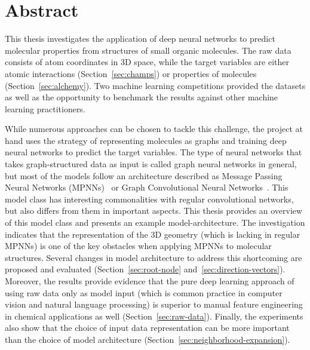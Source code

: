%


%
%


\section*{\Huge{Abstract}}

\vspace{1cm}
\noindent This thesis investigates the application of deep neural networks to predict molecular properties from structures of small organic molecules. The raw data consists of atom coordinates in 3D space, while the target variables are either atomic interactions (Section~\ref{sec:champs}) or properties of molecules (Section~\ref{sec:alchemy}). Two machine learning competitions provided the datasets as well as the opportunity to benchmark the results against other machine learning practitioners.

While numerous approaches can be chosen to tackle this challenge, the project at hand uses the strategy of representing molecules as graphs and training deep neural networks to predict the target variables. The type of neural networks that takes graph-structured data as input is called graph neural networks in general, but most of the models follow an architecture described as Message Passing Neural Networks (MPNNs)~\cite{Gilmer2017} or Graph Convolutional Neural Networks~\cite{Schutt2017}. This model class has interesting commonalities with regular convolutional networks, but also differs from them in important aspects. This thesis provides an overview of this model class and presents an example model-architecture. The investigation indicates that the representation of the 3D geometry (which is lacking in regular MPNNs) is one of the key obstacles when applying MPNNs to molecular structures. Several changes in model architecture to address this shortcoming are proposed and evaluated (Section~\ref{sec:root-node} and~\ref{sec:direction-vectors}). Moreover, the results provide evidence that the pure deep learning approach of using raw data only as model input (which is common practice in computer vision and natural language processing) is superior to manual feature engineering in chemical applications as well (Section~\ref{sec:raw-data}). Finally, the experiments also show that the choice of input data representation can be more important than the choice of model architecture (Section~\ref{sec:neighborhood-expansion}).

